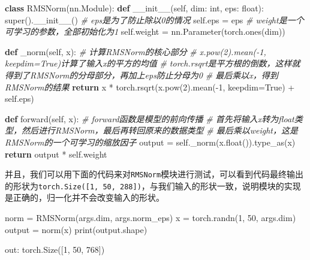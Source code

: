 \documentclass[
]{article}
\newenvironment{Shaded}{}{}
\newcommand{\BuiltInTok}[1]{\textcolor[rgb]{0.00,0.50,0.00}{#1}}
\newcommand{\CommentTok}[1]{\textcolor[rgb]{0.38,0.63,0.69}{\textit{#1}}}
\newcommand{\ControlFlowTok}[1]{\textcolor[rgb]{0.00,0.44,0.13}{\textbf{#1}}}
\newcommand{\DecValTok}[1]{\textcolor[rgb]{0.25,0.63,0.44}{#1}}
\newcommand{\FunctionTok}[1]{\textcolor[rgb]{0.02,0.16,0.49}{#1}}
\newcommand{\KeywordTok}[1]{\textcolor[rgb]{0.00,0.44,0.13}{\textbf{#1}}}
\newcommand{\NormalTok}[1]{#1}
\newcommand{\OperatorTok}[1]{\textcolor[rgb]{0.40,0.40,0.40}{#1}}
\newcommand{\VariableTok}[1]{\textcolor[rgb]{0.10,0.09,0.49}{#1}}
\begin{document}
\begin{Shaded}
\begin{Highlighting}[]
\KeywordTok{class}\NormalTok{ RMSNorm(nn.Module):}
    \KeywordTok{def} \FunctionTok{\_\_init\_\_}\NormalTok{(}\VariableTok{self}\NormalTok{, dim: }\BuiltInTok{int}\NormalTok{, eps: }\BuiltInTok{float}\NormalTok{):}
        \BuiltInTok{super}\NormalTok{().}\FunctionTok{\_\_init\_\_}\NormalTok{()}
        \CommentTok{\# eps是为了防止除以0的情况}
        \VariableTok{self}\NormalTok{.eps }\OperatorTok{=}\NormalTok{ eps}
        \CommentTok{\# weight是一个可学习的参数，全部初始化为1}
        \VariableTok{self}\NormalTok{.weight }\OperatorTok{=}\NormalTok{ nn.Parameter(torch.ones(dim))}

    \KeywordTok{def}\NormalTok{ \_norm(}\VariableTok{self}\NormalTok{, x):}
        \CommentTok{\# 计算RMSNorm的核心部分}
        \CommentTok{\# x.pow(2).mean({-}1, keepdim=True)计算了输入x的平方的均值}
        \CommentTok{\# torch.rsqrt是平方根的倒数，这样就得到了RMSNorm的分母部分，再加上eps防止分母为0}
        \CommentTok{\# 最后乘以x，得到RMSNorm的结果}
        \ControlFlowTok{return}\NormalTok{ x }\OperatorTok{*}\NormalTok{ torch.rsqrt(x.}\BuiltInTok{pow}\NormalTok{(}\DecValTok{2}\NormalTok{).mean(}\OperatorTok{{-}}\DecValTok{1}\NormalTok{, keepdim}\OperatorTok{=}\VariableTok{True}\NormalTok{) }\OperatorTok{+} \VariableTok{self}\NormalTok{.eps)}

    \KeywordTok{def}\NormalTok{ forward(}\VariableTok{self}\NormalTok{, x):}
        \CommentTok{\# forward函数是模型的前向传播}
        \CommentTok{\# 首先将输入x转为float类型，然后进行RMSNorm，最后再转回原来的数据类型}
        \CommentTok{\# 最后乘以weight，这是RMSNorm的一个可学习的缩放因子}
\NormalTok{        output }\OperatorTok{=} \VariableTok{self}\NormalTok{.\_norm(x.}\BuiltInTok{float}\NormalTok{()).type\_as(x)}
        \ControlFlowTok{return}\NormalTok{ output }\OperatorTok{*} \VariableTok{self}\NormalTok{.weight}
\end{Highlighting}
\end{Shaded}

并且，我们可以用下面的代码来对\texttt{RMSNorm}模块进行测试，可以看到代码最终输出的形状为\texttt{torch.Size({[}1,\ 50,\ 288{]})}，与我们输入的形状一致，说明模块的实现是正确的，归一化并不会改变输入的形状。

\begin{Shaded}
\begin{Highlighting}[]
\NormalTok{norm }\OperatorTok{=}\NormalTok{ RMSNorm(args.dim, args.norm\_eps)}
\NormalTok{x }\OperatorTok{=}\NormalTok{ torch.randn(}\DecValTok{1}\NormalTok{, }\DecValTok{50}\NormalTok{, args.dim)}
\NormalTok{output }\OperatorTok{=}\NormalTok{ norm(x)}
\BuiltInTok{print}\NormalTok{(output.shape)}

\NormalTok{out:}
\NormalTok{torch.Size([}\DecValTok{1}\NormalTok{, }\DecValTok{50}\NormalTok{, }\DecValTok{768}\NormalTok{])}
\end{Highlighting}
\end{Shaded}
\end{document}
